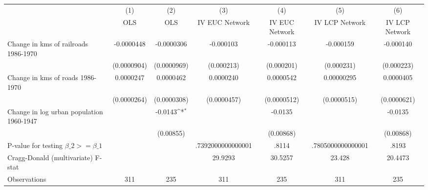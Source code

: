 {
\def\sym#1{\ifmmode^{#1}\else\(^{#1}\)\fi}
\begin{tabular}{l*{6}{c}}
\hline\hline
                &\multicolumn{1}{c}{(1)}&\multicolumn{1}{c}{(2)}&\multicolumn{1}{c}{(3)}&\multicolumn{1}{c}{(4)}&\multicolumn{1}{c}{(5)}&\multicolumn{1}{c}{(6)}\\
                &\multicolumn{1}{c}{OLS}&\multicolumn{1}{c}{OLS}&\multicolumn{1}{c}{IV EUC Network}&\multicolumn{1}{c}{IV EUC Network}&\multicolumn{1}{c}{IV LCP Network}&\multicolumn{1}{c}{IV LCP Network}\\
\hline
Change in kms of railroads 1986-1970&-0.0000448         &-0.0000306         &-0.000103         &-0.000113         &-0.000159         &-0.000140         \\
                &(0.0000904)         &(0.0000969)         &(0.000213)         &(0.000201)         &(0.000231)         &(0.000223)         \\
[1em]
Change in kms of roads 1986-1970&0.0000247         &0.0000462         &0.0000240         &0.0000542         &0.00000295         &0.0000405         \\
                &(0.0000264)         &(0.0000308)         &(0.0000457)         &(0.0000512)         &(0.0000515)         &(0.0000621)         \\
[1em]
Change in log urban population 1960-1947&                  &  -0.0143\sym{*}  &                  &  -0.0135         &                  &  -0.0135         \\
                &                  &(0.00855)         &                  &(0.00868)         &                  &(0.00868)         \\
\hline
P-value for testing $\beta\_{2} >= \beta\_{1}$&                  &                  &.7392000000000001         &    .8114         &.7805000000000001         &    .8193         \\
Cragg-Donald (multivariate) F-stat&                  &                  &  29.9293         &  30.5257         &   23.428         &  20.4473         \\
Observations    &      311         &      235         &      311         &      235         &      311         &      235         \\
\hline\hline
\end{tabular}
}
